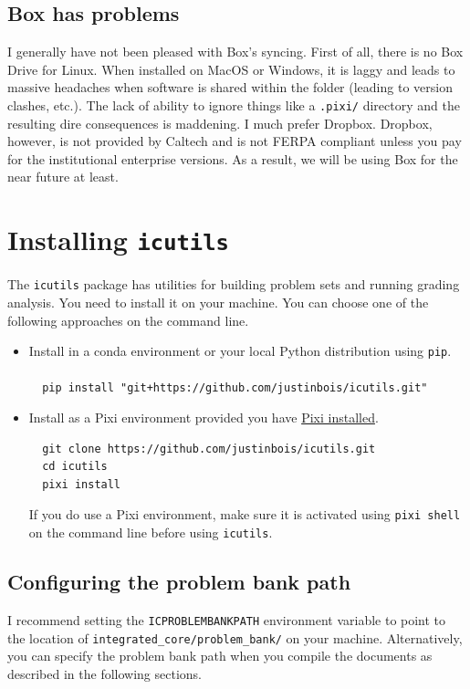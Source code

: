 \subsection{Box has problems}
I generally have not been pleased with Box's syncing. First of all, there is no Box Drive for Linux. When installed on MacOS or Windows, it is laggy and leads to massive headaches when software is shared within the folder (leading to version clashes, etc.). The lack of ability to ignore things like a \verb|.pixi/| directory and the resulting dire consequences is maddening. I much prefer Dropbox. Dropbox, however, is not provided by Caltech and is not FERPA compliant unless you pay for the institutional enterprise versions. As a result, we will be using Box for the near future at least.

\pagebreak

\section{Installing \texttt{icutils}}
The \texttt{icutils} package has utilities for building problem sets and running grading analysis. You need to install it on your machine. You can choose one of the following approaches on the command line.

\begin{itemize}
  \item Install in a conda environment or your local Python distribution using \texttt{pip}.\\\\\verb|  pip install "git+https://github.com/justinbois/icutils.git"|\\
  \item Install as a Pixi environment provided you have \href{https://pixi.prefix.dev/latest/installation/}{Pixi installed}.\begin{verbatim}
  git clone https://github.com/justinbois/icutils.git
  cd icutils
  pixi install
\end{verbatim}
  If you do use a Pixi environment, make sure it is activated using \texttt{pixi shell} on the command line before using \texttt{icutils}.
\end{itemize}

\subsection{Configuring the problem bank path}
I recommend setting the \verb|ICPROBLEMBANKPATH| environment variable to point to the location of \verb|integrated_core/problem_bank/| on your machine. Alternatively, you can specify the problem bank path when you compile the documents as described in the following sections.

